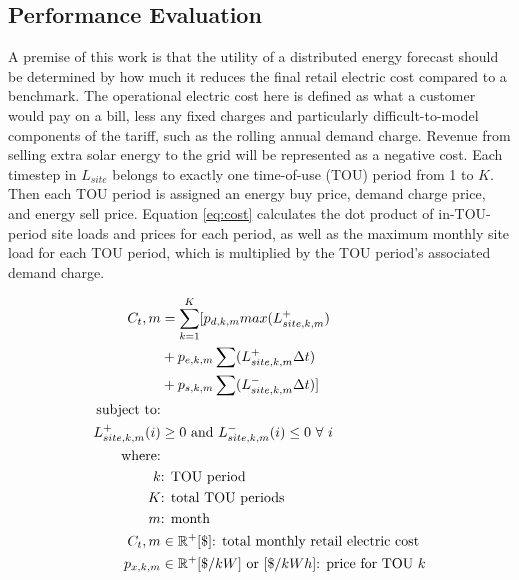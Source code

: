 \documentclass[conference]{IEEEtran}
\begin{document}
\subsection{Performance Evaluation}

A premise of this work is that the utility of a distributed energy forecast should be determined by how much it reduces the final retail electric cost compared to a benchmark. The operational electric cost here is defined as what a customer would pay on a bill, less any fixed charges and particularly difficult-to-model components of the tariff, such as the rolling annual demand charge. Revenue from selling extra solar energy to the grid will be represented as a negative cost. Each timestep in $L_{site}$ belongs to exactly one time-of-use (TOU) period from 1 to $K$. Then each TOU period is assigned an energy buy price, demand charge price, and energy sell price. Equation \ref{eq:cost} calculates the dot product of in-TOU-period site loads and prices for each period, as well as the maximum monthly site load for each TOU period, which is multiplied by the TOU period's associated demand charge.

\begin{align}
    C_t,m           & = \sum_{k=1}^K [p_{d,k,m}  max(L^+_{site,k,m})  \notag \\
                & + p_{e,k,m} \sum (L^+_{site,k,m}\Delta t)  \notag \\
                & + p_{s,k,m} \sum (L^-_{site,k,m}\Delta t) ] \label{eq:cost} \\
                 \text{subject to:}&  \notag \\
                L_{site,k,m}^+(i) & \ge 0 \text{ and } L_{site,k,m}^-(i) \le 0\ \forall\ i \notag \\
                \text{where:}& \notag \\
                k & \text{: TOU period} \notag \\
                K & \text{: total TOU periods} \notag \\
                m & \text{: month} \notag \\
    C_t,m         & \in \mathbb{R}^+ [\$] \text{: total monthly retail electric cost} \notag \\
    p_{x,k,m}     & \in \mathbb{R}^+ [\$/kW] \text{ or } [\$/kWh] \text{: price for TOU } k \notag 
\end{align}
\end{document}
